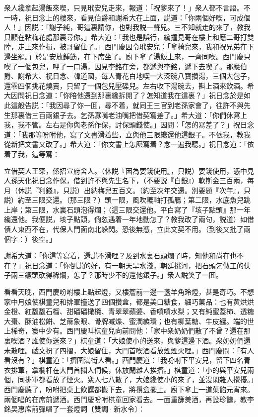 衆人纔拿起湯飯來喫，只見玳安兒走來，報道：「祝爹來了！」衆人都不言語。不一時，祝日念上的樓來，看見伯爵和謝希大在上面，説道：「你兩個好喫，可成個人！」因説：「謝子純，哥這裏請你，也對我説一聲兒。三不知就走的來了，教我只顧在粘梅花處那裏尋你。」希大道：「我也是誤行，纔撞見哥在樓上和應二哥打雙陸，走上來作揖，被哥留住了。」西門慶因令玳安兒：「拿椅兒來，我和祝兄弟在下邊坐罷。」於是安放鍾筯，在下席坐了。廚下拿了湯飯上來，一齊同喫。西門慶只喫了一個包兒，呷了一口湯，因見李銘在旁，都遞與李銘，遞下去喫了。那應伯爵、謝希大、祝日念、韓道國，每人青花白地喫一大深碗八寳攢湯，三個大包子，還零四個挑花燒賣，只留了一個包兒壓碟兒。左右收下湯碗去，斟上酒來飲酒。希大因問祝日念道：「你陪他還到那裏纔拆開了？怎知道我在這裏？」祝日念於是如此這般告説：「我因尋了你一囬，尋不着，就同王三官到老孫家會了，往許不與先生那裏借三百兩銀子去。乞孫寡嘴老油嘴把借契寫差了。」希大道：「你們休寫上我，我不管。左右是你與老孫作保，討保頭錢使。」因問：「怎的冩差了？」祝日念道：「我那等吩咐他，寫了文書滑着些，立與他三限纔還他這銀子。不依我，教我從新把文書又改了。」希大道：「你文書上怎麽寫着？念一遍我聽。」祝日念道：「依着了我，這等寫：

\begin{myquote}[\markfont]
立借契人王寀，係招宣府舍人。{\kaishu（休説『因為要錢使用』，只説）}要錢使用，憑中見人孫天化祝日念作保，借到許不與先生名下，{\kaishu（不要説『白銀』）}軟斯金三百兩，每月{\kaishu（休説『利錢』，只説）}出納梅兒五百文。{\kaishu（約至次年交還。別要題『次年』，只説）}約至三限交還。{\kaishu（那三限？）}頭一限，風吹轆軸打孤鴈；第二限，水底魚兒跳上岸；第三限，水裏石頭泡得爛；{\kaishu（這三限交還他。平白寫了『垓子點頭』那一年纔還他。我便説，垓子點頭，倘忽遇着一年地動怎了？教我改了兩句，説道）}如借債人東西不在，代保人門面南北躲閃。恐後無憑，立此文契不用。{\kaishu（到後又批了兩個字：）}後空。」
\end{myquote}

謝希大道：「你這等寫着，還説不滑哩？及到水裏石頭爛了時，知他和尚在也不在？」祝日念道：「你倒説的好，有一朝天旱水淺，朝廷挑河，把石頭乞做工的伕子兩三鐝頭砍得稀爛，怎了？那時少不的還他銀子。」衆人説笑了一囬。

看看天晚，西門慶吩咐樓上點起燈，又樓簷前一邊一盞羊角玲燈，甚是奇巧。不想家中月娘使棋童兒和排軍擡送了四個攢盒，都是美口糖食，細巧菓品：也有黄烘烘金橙、紅馥馥石榴、甜磂磂橄欖、青翠翠蘋婆、香噴噴水梨；又有純蜜蓋柿、透糖大棗、酥油松餅、芝蔴象眼、骨牌减煠、蜜潤縧環；也有柳葉糖、牛皮纏。端的世上稀奇，寰中少有。西門慶叫棋童兒向前問他：「家中衆奶奶們散了不曾？還在那裏喫酒？誰使你送來？」棋童道：「大娘使小的送來，與爹這邊下酒。衆奶奶們還未散哩。戯文扮了四摺，大娘留住，大門首喫酒看放煙煙火哩。」西門慶問：「有人看沒有？」棋童道：「擠圍滿街人看。」西門慶道：「我吩咐下平安兒，留下四名青衣排軍，拿欄杆在大門首攔人伺候，休放閑雜人挨擠。」棋童道：「小的與平安兒兩個，同排軍都看放了煙火。衆人七八散了，大娘纔使小的來了，並沒閑雜人攪擾。」西門慶聽了，吩咐把桌上飲饌都搬下去，將攢盒擺上。廚下拿上一道菓餡元宵來。兩個唱的在席前遞酒。西門慶吩咐棋童回家看去。一面重篩羙酒，再設珍饈，教李銘吴惠席前彈唱了一套燈詞〔雙調·新水令〕：


